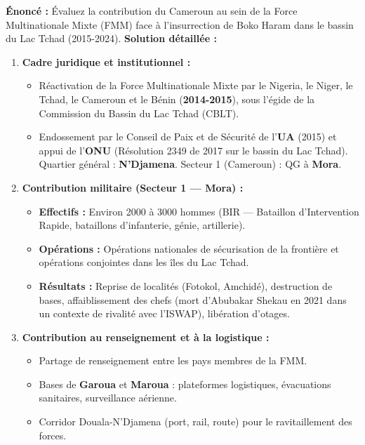 \documentclass[11pt]{article}
\begin{document}
\begin{exoresolu}
    \textbf{Énoncé :} Évaluez la contribution du Cameroun au sein de la Force Multinationale Mixte (FMM) face à l'insurrection de Boko Haram dans le bassin du Lac Tchad (2015-2024).
    \tcblower
    \textbf{Solution détaillée :}
    \begin{enumerate}
        \item \textbf{Cadre juridique et institutionnel :}
            \begin{itemize}
                \item Réactivation de la Force Multinationale Mixte par le Nigeria, le Niger, le Tchad, le Cameroun et le Bénin (\textbf{2014-2015}), sous l'égide de la Commission du Bassin du Lac Tchad (CBLT).
                \item Endossement par le Conseil de Paix et de Sécurité de l'\textbf{UA} (2015) et appui de l'\textbf{ONU} (Résolution 2349 de 2017 sur le bassin du Lac Tchad). Quartier général : \textbf{N'Djamena}. Secteur 1 (Cameroun) : QG à \textbf{Mora}.
            \end{itemize}
        \item \textbf{Contribution militaire (Secteur 1 — Mora) :}
            \begin{itemize}
                \item \textbf{Effectifs :} Environ 2000 à 3000 hommes (BIR — Bataillon d'Intervention Rapide, bataillons d'infanterie, génie, artillerie).
                \item \textbf{Opérations :} Opérations nationales de sécurisation de la frontière et opérations conjointes dans les îles du Lac Tchad.
                \item \textbf{Résultats :} Reprise de localités (Fotokol, Amchidé), destruction de bases, affaiblissement des chefs (mort d'Abubakar Shekau en 2021 dans un contexte de rivalité avec l'ISWAP), libération d'otages.
            \end{itemize}
        \item \textbf{Contribution au renseignement et à la logistique :}
            \begin{itemize}
                \item Partage de renseignement entre les pays membres de la FMM.
                \item Bases de \textbf{Garoua} et \textbf{Maroua} : plateformes logistiques, évacuations sanitaires, surveillance aérienne.
                \item Corridor Douala-N'Djamena (port, rail, route) pour le ravitaillement des forces.

\end{itemize}
\end{enumerate}
\end{exoresolu}
\end{document}
